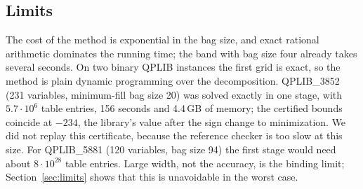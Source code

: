 \subsection{Limits}\label{sec:comp-limits}
The cost of the method is exponential in the bag size, and exact rational
arithmetic dominates the running time; the band with bag size four already
takes several seconds. On two binary QPLIB instances \cite{FuriniEtAl2019}
the first grid is exact, so the method is plain dynamic programming over the
decomposition. QPLIB\_3852 (231 variables, minimum-fill bag size 20) was
solved exactly in one stage, with $5.7\cdot10^6$ table entries, 156 seconds
and 4.4\,GB of memory; the certified bounds coincide at $-234$, the library's
value after the sign change to minimization. We did not replay this
certificate, because the reference checker is too slow at this size. For
QPLIB\_5881 (120 variables, bag size 94) the first stage would need about
$8\cdot10^{28}$ table entries. Large width, not the accuracy, is the binding
limit; Section~\ref{sec:limits} shows that this is unavoidable in the worst
case.
